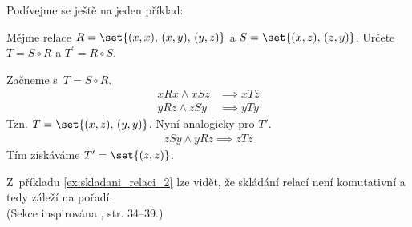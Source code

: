 Podívejme se ještě na jeden příklad:
\begin{example}\label{ex:skladani_relaci_2}
    Mějme relace $R=\set{(x,x),\,(x,y),\,(y,z)}$ a $S=\set{(x,z),\,(z,y)}$. Určete $T=S\circ R$ a $T^\prime=R\circ S$.
\end{example}
\begin{solution}
    Začneme s~$T=S\circ R$.
    \begin{align*}
        xRx \land xSz &\implies xTz\\
        yRz \land zSy &\implies yTy
    \end{align*}
    Tzn. $T=\set{(x,z),\,(y,y)}$. Nyní analogicky pro $T\prime$.
    \begin{align*}
        zSy \land yRz \implies zTz
    \end{align*}
    Tím získáváme $T^\prime=\set{(z,z)}$.
\end{solution}
Z~příkladu \ref{ex:skladani_relaci_2} lze vidět, že skládání relací není komutativní a tedy záleží na pořadí.\\
(Sekce inspirována \cite{MatousekNesetril2009}, str. 34--39.)